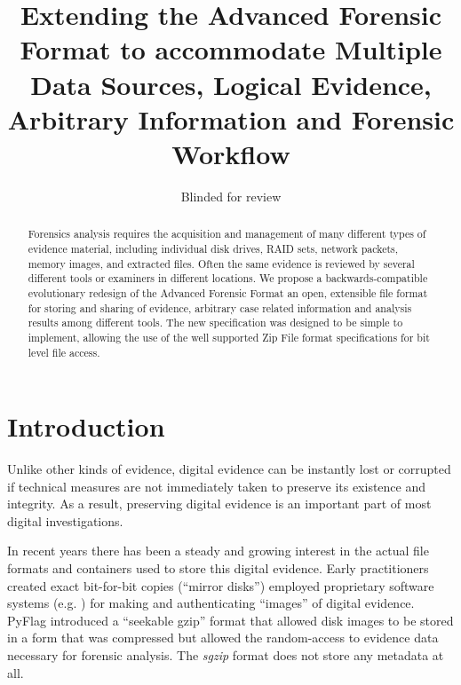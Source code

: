 \documentclass[10pt, conference]{IEEEtran}
\begin{document}
\title{Extending the Advanced Forensic Format to accommodate Multiple
  Data Sources, Logical Evidence, Arbitrary Information and Forensic Workflow}
\author{Blinded for review}
\maketitle

\begin{abstract}
Forensics analysis requires the acquisition and management of many
different types of evidence material, including individual disk
drives, RAID sets, network packets, memory images, and extracted
files. Often the same evidence is reviewed by several different tools
or examiners in different locations. We propose a backwards-compatible
evolutionary redesign of the Advanced Forensic Format an open,
extensible file format for storing and sharing of evidence, arbitrary
case related information and analysis results among different
tools. The new specification was designed to be simple to implement,
allowing the use of the well supported Zip File format specifications
for bit level file access.
\end{abstract}

\section{Introduction}
Unlike other kinds of evidence, digital evidence can be instantly lost
or corrupted if technical measures are not immediately taken to
preserve its existence and integrity. As a result, preserving digital
evidence is an important part of most digital
investigations\cite{carrier:event-based}.

In recent years there has been a steady and growing interest in the
actual file formats and containers used to store this digital
evidence. Early practitioners created exact bit-for-bit copies
(``mirror disks'') employed proprietary software systems
(e.g. \cite{safeback,ilook,encase}) for making and authenticating
``images'' of digital evidence. PyFlag\cite{pyflag} introduced a
``seekable gzip'' format that allowed disk images to be stored in a
form that was compressed but allowed the random-access to evidence
data necessary for forensic analysis. The \emph{sgzip} format does not
store any metadata at all.
\end{document}
